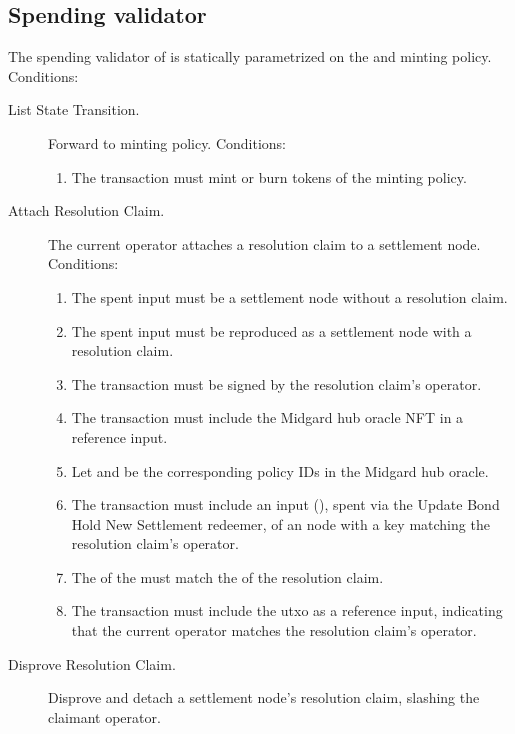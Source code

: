 \documentclass[../midgard.tex]{subfiles}
\begin{document}
\subsection{Spending validator}
\label{h:settlement-spending-validator}

The spending validator of  is statically parametrized on the  and  minting policy.
Conditions:
\begin{description}
  \item[List State Transition.] Forward to minting policy.
    Conditions:
      \begin{enumerate}
          \item The transaction must mint or burn tokens of the  minting policy.
      \end{enumerate}
  \item[Attach Resolution Claim.] The current operator attaches a resolution claim to a settlement node.
    Conditions:
      \begin{enumerate}
        \item The spent input must be a settlement node without a resolution claim.
        \item The spent input must be reproduced as a settlement node with a resolution claim.
        \item The transaction must be signed by the resolution claim's operator.
        \item The transaction must include the Midgard hub oracle NFT in a reference input.
        \item Let  and  be the corresponding policy IDs in the Midgard hub oracle.
        \item The transaction must include an input (), spent via the Update Bond Hold New Settlement redeemer, of an  node with a key matching the resolution claim's operator.
        \item The  of the  must match the  of the resolution claim.
        \item The transaction must include the  utxo as a reference input, indicating that the current operator matches the resolution claim's operator.
      \end{enumerate}
  \item[Disprove Resolution Claim.] Disprove and detach a settlement node's resolution claim, slashing the claimant operator.

\end{description}
\end{document}
